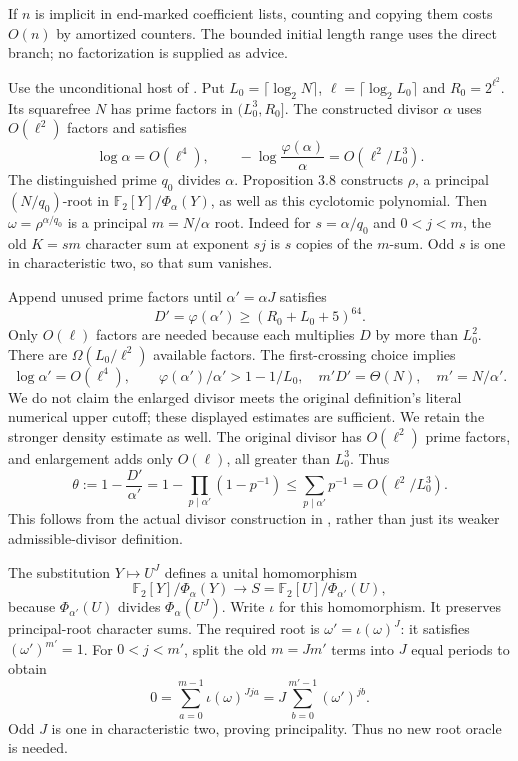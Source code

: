 \documentclass[11pt]{article}
\newcommand{\F}{\mathbb F}
\begin{document}
If $n$ is implicit in end-marked coefficient lists, counting and copying
them costs $O(n)$ by amortized counters. The bounded initial length
range uses the direct branch; no factorization is supplied as advice.

Use the unconditional host of \cite{cyclomult}. Put
$L_0=\lceil\log_2N\rceil$, $\ell=\lceil\log_2L_0\rceil$ and
$R_0=2^{\ell^2}$. Its squarefree $N$ has prime factors in
$(L_0^3,R_0]$. The constructed divisor $\alpha$ uses $O(\ell^2)$
factors and satisfies
\[
 \log\alpha=O(\ell^4),\qquad
 -\log\frac{\varphi(\alpha)}\alpha=O(\ell^2/L_0^3).
\]
The distinguished prime $q_0$ divides $\alpha$. Proposition 3.8
constructs $\rho$, a principal $(N/q_0)$-root in
$\F_2[Y]/\Phi_\alpha(Y)$, as well as this cyclotomic polynomial.
Then $\omega=\rho^{\alpha/q_0}$ is a principal $m=N/\alpha$ root.
Indeed for $s=\alpha/q_0$ and $0<j<m$, the old $K=sm$ character sum
at exponent $sj$ is $s$ copies of the $m$-sum. Odd $s$ is one in
characteristic two, so that sum vanishes.

Append unused prime factors until $\alpha'=\alpha J$ satisfies
\[
 D'=\varphi(\alpha')\ge(R_0+L_0+5)^{64}.
\]
Only $O(\ell)$ factors are needed because each multiplies $D$ by more
than $L_0^2$. There are $\Omega(L_0/\ell^2)$ available factors.
The first-crossing choice implies
\[
 \log\alpha'=O(\ell^4),\qquad
 \varphi(\alpha')/\alpha'>1-1/L_0,
 \quad m'D'=\Theta(N),\quad m'=N/\alpha'.
\]
We do not claim the enlarged divisor meets the original definition's
literal numerical upper cutoff; these displayed estimates are sufficient.
We retain the stronger density estimate as well. The original divisor
has $O(\ell^2)$ prime factors, and enlargement adds only $O(\ell)$,
all greater than $L_0^3$. Thus
\begin{equation}
 \label{eq:strong-density}
 \theta:=1-\frac{D'}{\alpha'}
   =1-\prod_{p\mid\alpha'}(1-p^{-1})
   \le\sum_{p\mid\alpha'}p^{-1}
   =O(\ell^2/L_0^3).
\end{equation}
This follows from the actual divisor construction in
\cite[Proposition 3.8, proof]{cyclomult}, rather than just its
weaker admissible-divisor definition.

The substitution $Y\mapsto U^J$ defines a unital homomorphism
\[
 \F_2[Y]/\Phi_\alpha(Y)\longrightarrow
 S=\F_2[U]/\Phi_{\alpha'}(U),
\]
because $\Phi_{\alpha'}(U)$ divides $\Phi_\alpha(U^J)$.
Write $\iota$ for this homomorphism. It preserves principal-root
character sums. The required root is
$\omega'=\iota(\omega)^J$: it satisfies $(\omega')^{m'}=1$.
For $0<j<m'$, split the old $m=Jm'$ terms into $J$ equal periods
to obtain
\[
 0=\sum_{a=0}^{m-1}\iota(\omega)^{Jja}
   =J\sum_{b=0}^{m'-1}(\omega')^{jb}.
\]
Odd $J$ is one in characteristic two, proving principality.
Thus no new root oracle is needed.
\end{document}
